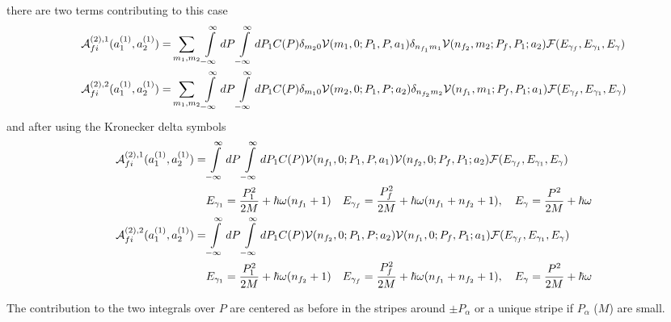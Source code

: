 there are two terms contributing to this case
\begin{align}
  {\cal A}_{fi}^{(2),1}(a_1^{(1)}, a_2^{(1)}) = & \sum\limits_{m_1,m_2}\int\limits_{-\infty}^{\infty}dP\int\limits_{-\infty}^{\infty}dP_1 C(P)\delta_{m_20}{\cal V}(m_1,0;P_1,P,a_1)\delta_{n_{f_1}m_1}{\cal V}(n_{f_2},m_2;P_f,P_1;a_2){\cal F}(E_{\gamma_f},E_{\gamma_1},E_\gamma)\nonumber\\
  {\cal A}_{fi}^{(2),2}(a_1^{(1)}, a_2^{(1)}) = & \sum\limits_{m_1,m_2}\int\limits_{-\infty}^{\infty}dP\int\limits_{-\infty}^{\infty}dP_1 C(P)\delta_{m_10}{\cal V}(m_2,0;P_1,P;a_2)\delta_{n_{f_2}m_2}{\cal V}(n_{f_1},m_1;P_f,P_1;a_1){\cal F}(E_{\gamma_f},E_{\gamma_1},E_\gamma)
\end{align}
and after using the Kronecker delta symbols
\begin{align}
  {\cal A}_{fi}^{(2),1}(a_1^{(1)}, a_2^{(1)}) = & \int\limits_{-\infty}^{\infty}dP\int\limits_{-\infty}^{\infty}dP_1 C(P){\cal V}(n_{f_1},0;P_1,P,a_1){\cal V}(n_{f_2},0;P_f,P_1;a_2){\cal F}(E_{\gamma_f},E_{\gamma_1},E_\gamma)\nonumber\\
  &E_{\gamma_1}=\frac{P_1^2}{2M} + \hbar\omega(n_{f_1}+1)\quad E_{\gamma_f} =\frac{P_f^2}{2M} + \hbar\omega(n_{f_1}+n_{f_2}+1),\quad E_\gamma = \frac{P^2}{2M} + \hbar\omega\\
  {\cal A}_{fi}^{(2),2}(a_1^{(1)}, a_2^{(1)}) =&\int\limits_{-\infty}^{\infty}dP\int\limits_{-\infty}^{\infty}dP_1 C(P){\cal V}(n_{f_2},0;P_1,P;a_2){\cal V}(n_{f_1},0;P_f,P_1;a_1){\cal F}(E_{\gamma_f},E_{\gamma_1},E_\gamma)\nonumber\\
  &E_{\gamma_1}=\frac{P_1^2}{2M} + \hbar\omega(n_{f_2}+1)\quad E_{\gamma_f} =\frac{P_f^2}{2M} + \hbar\omega(n_{f_1}+n_{f_2}+1),\quad E_\gamma = \frac{P^2}{2M} + \hbar\omega
\end{align}

The contribution to the two integrals over $P$ are centered as before in the stripes around $\pm P_\alpha$ or a unique stripe if $P_\alpha$ ($M$) are small.
